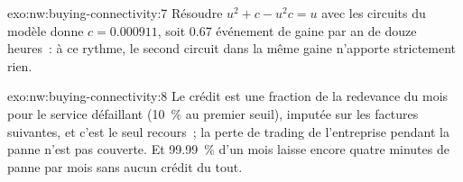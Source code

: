 \begin{solution}{exo:nw:buying-connectivity:7}
Résoudre $u^2 + c - u^2 c = u$ avec les circuits du modèle donne $c = 0.000911$, soit 0.67 événement de gaine par an de douze heures~: à ce rythme, le second
circuit dans la même gaine n'apporte strictement rien.
\end{solution}

\begin{solution}{exo:nw:buying-connectivity:8}
Le crédit est une fraction de la redevance du mois pour le service défaillant (10~\% au premier seuil), imputée sur les factures suivantes, et c'est le
seul recours~; la perte de trading de l'entreprise pendant la panne n'est pas couverte. Et 99.99~\% d'un mois laisse encore quatre minutes de panne par mois sans
aucun crédit du tout.
\end{solution}

